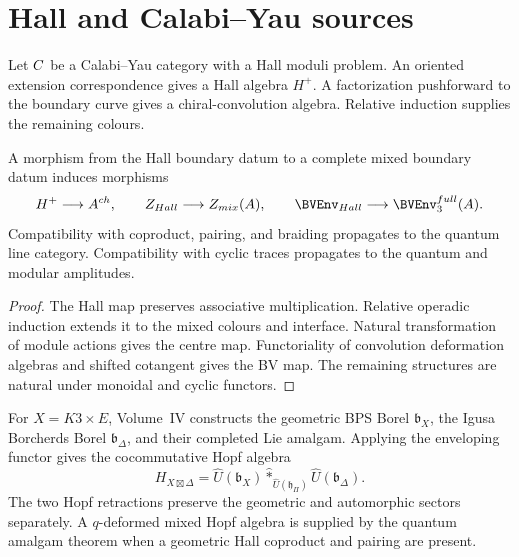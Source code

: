\chapter{Hall and Calabi--Yau sources}
Let $C$ be a Calabi--Yau category with a Hall moduli problem.  An oriented extension correspondence gives a Hall algebra $H^+$.  A factorization pushforward to the boundary curve gives a chiral-convolution algebra.  Relative induction supplies the remaining colours.

\begin{theorem}
A morphism from the Hall boundary datum to a complete mixed boundary datum induces morphisms
\[
 H^+\longrightarrow A^{\ch},
 \qquad
 Z_{\mathrm{Hall}}\longrightarrow Z_{\mathrm{mix}}(\mathbb A),
 \qquad
 \BVEnv_{\mathrm{Hall}}\longrightarrow\BVEnv_3^{\mathrm{full}}(\mathbb A).
\]
Compatibility with coproduct, pairing, and braiding propagates to the quantum line category.  Compatibility with cyclic traces propagates to the quantum and modular amplitudes.
\end{theorem}
\begin{proof}
The Hall map preserves associative multiplication.  Relative operadic induction extends it to the mixed colours and interface.  Natural transformation of module actions gives the centre map.  Functoriality of convolution deformation algebras and shifted cotangent gives the BV map.  The remaining structures are natural under monoidal and cyclic functors.
\end{proof}

For $X=K3\times E$, Volume~IV constructs the geometric BPS Borel $\mathfrak b_X$, the Igusa Borcherds Borel $\mathfrak b_\Delta$, and their completed Lie amalgam.  Applying the enveloping functor gives the cocommutative Hopf algebra
\[
 H_{X\boxtimes\Delta}
 =\widehat U(\mathfrak b_X)
  \widehat *_{\widehat U(\mathfrak h_\Pi)}
  \widehat U(\mathfrak b_\Delta).
\]
The two Hopf retractions preserve the geometric and automorphic sectors separately.  A $q$-deformed mixed Hopf algebra is supplied by the quantum amalgam theorem when a geometric Hall coproduct and pairing are present.

